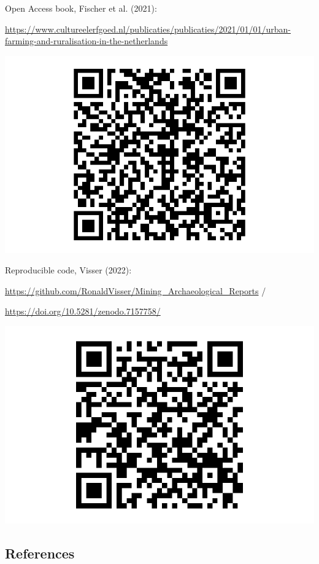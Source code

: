 \documentclass[
  letterpaper,
  DIV=11,
  numbers=noendperiod]{scrartcl}
\begin{document}
Open Access book, Fischer et al. (2021):

\url{https://www.cultureelerfgoed.nl/publicaties/publicaties/2021/01/01/urban-farming-and-ruralisation-in-the-netherlands}

\includegraphics{index_files/figure-pdf/unnamed-chunk-3-1.pdf}

Reproducible code, Visser (2022):

\url{https://github.com/RonaldVisser/Mining_Archaeological_Reports} /

\url{https://doi.org/10.5281/zenodo.7157758/}

\includegraphics{index_files/figure-pdf/unnamed-chunk-4-1.pdf}

\hypertarget{references}{%
\subsection*{References}\label{references}}
\end{document}
